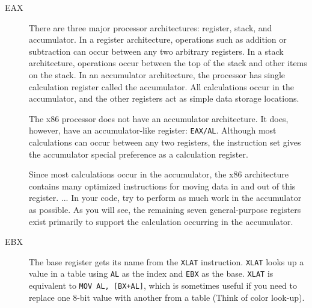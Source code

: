 \begin{description}
\item[EAX] There are three major processor architectures: register, stack, and
  accumulator. In a register architecture, operations such as addition or subtraction can
  occur between any two arbitrary registers. In a stack architecture, operations occur
  between the top of the stack and other items on the stack. In an accumulator
  architecture, the processor has single calculation register called the accumulator. All
  calculations occur in the accumulator, and the other registers act as simple data
  storage locations.

  The x86 processor does not have an accumulator architecture. It does, however, have an
  accumulator-like register: \texttt{EAX/AL}. Although most calculations can occur between
  any two registers, the instruction set gives the accumulator special preference as a
  calculation register.

  Since most calculations occur in the accumulator, the x86 architecture contains many
  optimized instructions for moving data in and out of this register. ... In your code,
  try to perform as much work in the accumulator as possible. As you will see, the
  remaining seven general-purpose registers exist primarily to support the calculation
  occurring in the accumulator.
\item[EBX] The base register gets its name from the \texttt{XLAT}
  instruction. \texttt{XLAT} looks up a value in a table using \texttt{AL} as the index
  and \texttt{EBX} as the base. \texttt{XLAT} is equivalent to
  \texttt{MOV AL, [BX+AL]},
  which is sometimes useful if you need to replace one 8-bit value with another from a
  table (Think of color look-up).


\end{description}
